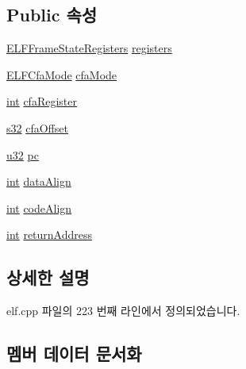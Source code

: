 \subsection*{Public 속성}
\begin{DoxyCompactItemize}
\item 
\mbox{\hyperlink{struct_e_l_f_frame_state_registers}{E\+L\+F\+Frame\+State\+Registers}} \mbox{\hyperlink{struct_e_l_f_frame_state_a581c2ecc500b258e244b75057eade6d2}{registers}}
\item 
\mbox{\hyperlink{elf_8cpp_a59b5196163516898039d7f4d41a3f393}{E\+L\+F\+Cfa\+Mode}} \mbox{\hyperlink{struct_e_l_f_frame_state_a4884a1a012a3593b5e9911775d53e1bc}{cfa\+Mode}}
\item 
\mbox{\hyperlink{_util_8cpp_a0ef32aa8672df19503a49fab2d0c8071}{int}} \mbox{\hyperlink{struct_e_l_f_frame_state_ab70d9959aa4b747f95b792ce0823979c}{cfa\+Register}}
\item 
\mbox{\hyperlink{_system_8h_a0ce6887c26c1c49ad3be5710dd42bfd6}{s32}} \mbox{\hyperlink{struct_e_l_f_frame_state_a944cba546e5de720d2c88bf80c3e1691}{cfa\+Offset}}
\item 
\mbox{\hyperlink{_system_8h_a10e94b422ef0c20dcdec20d31a1f5049}{u32}} \mbox{\hyperlink{struct_e_l_f_frame_state_abc2236d70ad34a4e4755c842b302bff1}{pc}}
\item 
\mbox{\hyperlink{_util_8cpp_a0ef32aa8672df19503a49fab2d0c8071}{int}} \mbox{\hyperlink{struct_e_l_f_frame_state_add20f26010b7c129b0473ca59c6feb84}{data\+Align}}
\item 
\mbox{\hyperlink{_util_8cpp_a0ef32aa8672df19503a49fab2d0c8071}{int}} \mbox{\hyperlink{struct_e_l_f_frame_state_ad5a26df4f99f4d5bdcfaea413e40b932}{code\+Align}}
\item 
\mbox{\hyperlink{_util_8cpp_a0ef32aa8672df19503a49fab2d0c8071}{int}} \mbox{\hyperlink{struct_e_l_f_frame_state_a3b450cc1d351b131706b7f99a606c2f4}{return\+Address}}
\end{DoxyCompactItemize}


\subsection{상세한 설명}


elf.\+cpp 파일의 223 번째 라인에서 정의되었습니다.



\subsection{멤버 데이터 문서화}
\mbox{\label{struct_e_l_f_frame_state_a4884a1a012a3593b5e9911775d53e1bc}} 
